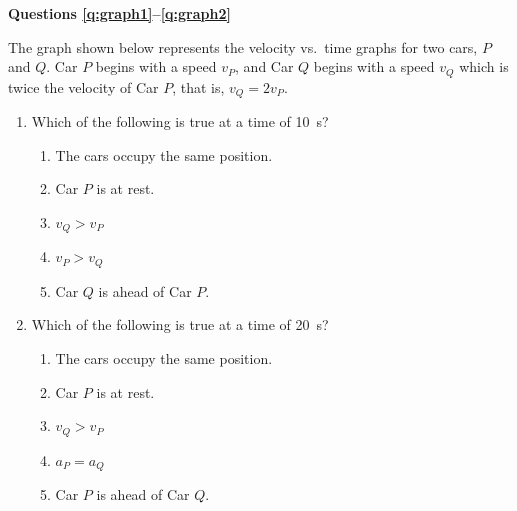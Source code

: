 \documentclass{../../../oss-apphys}
\begin{document}
\begin{multicols}{2}
  \textbf{Questions \ref{q:graph1}--\ref{q:graph2}}

  The graph shown below represents the velocity vs.\ time graphs for two cars,
  $P$ and $Q$. Car $P$ begins with a speed $v_P$, and Car $Q$ begins with a
  speed $v_Q$ which is twice the velocity of Car $P$, that is, $v_Q=2v_P$.
  \begin{center}
  \end{center}
  \begin{enumerate}[resume,leftmargin=18pt]
  \item Which of the following is true at a time of \SI{10}{\second}?
    \begin{enumerate}[nosep,leftmargin=18pt,label=(\Alph*)]
    \item The cars occupy the same position.
    \item Car $P$ is at rest.
    \item $v_Q>v_P$
    \item $v_P>v_Q$
    \item Car $Q$ is ahead of Car $P$.
    \end{enumerate}
    \label{q:graph1}
    
  \item Which of the following is true at a time of \SI{20}{\second}?
    \begin{enumerate}[nosep,leftmargin=18pt,label=(\Alph*)]
    \item The cars occupy the same position.
    \item Car $P$ is at rest.
    \item $v_Q>v_P$
    \item $a_P=a_Q$
    \item Car $P$ is ahead of Car $Q$.
    \end{enumerate}
    \label{q:graph2}
    

\end{enumerate}
\end{multicols}
\end{document}
